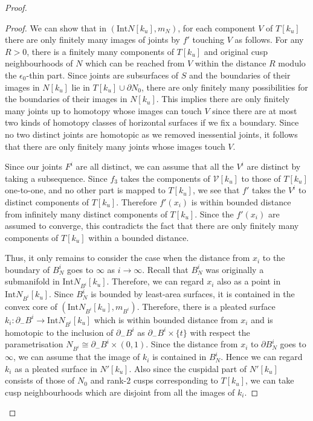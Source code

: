 \documentclass{amsart}
\theoremstyle{definition}
\numberwithin{figure}{section}
\numberwithin{equation}{section}
\def\cv{\mathcal{V}}
\def\Int{\mathrm{Int}}
\begin{document}
\begin{proof}
\begin{proof}
We can show that in $(\Int N[k_u], m_N)$, for each component $V$ of $T[k_u]$ there are only finitely many images of joints by $f'$ touching $V$ as follows.
For any $R>0$, there is a finitely many components of $T[k_u]$ and original cusp neighbourhoods of $N$ which can be reached from $V$ within the distance $R$ modulo the $\epsilon_0$-thin part.
Since joints are subsurfaces of $S$ and the boundaries of their images in $N[k_u]$ lie in $T[k_u] \cup \partial N_0$, there are only finitely many possibilities for the boundaries of their images in $N[k_u]$.
This implies there are only finitely many joints up to homotopy whose images can touch $V$ since there are at most two kinds of homotopy classes of horizontal surfaces if we fix a boundary.
Since no two distinct joints are homotopic as we removed inessential joints, it follows that there are only finitely many joints whose images touch $V$.

Since our joints $F^i$ are all distinct, we can assume that all the $V^i$ are distinct by taking a subsequence.
Since $f_3$ takes the components of $\cv[k_u]$ to those of $T[k_u]$ one-to-one, and no other part is mapped to $T[k_u]$, we see that $f'$ takes the $V^i$ to distinct components of $T[k_u]$.
Therefore $f'(x_i)$ is within bounded distance from infinitely many distinct components of $T[k_u]$.
Since the $f'(x_i)$ are assumed to  converge, this contradicts the fact that there are only finitely many components of $T[k_u]$ within a bounded distance.

 
Thus, it only remains to consider the case when the distance from $x_i$ to the boundary of $B^i_N$ goes to $\infty$ as $i \rightarrow \infty$.
Recall that $B^i_N$ was originally a submanifold in $\Int N_{B^i}[k_u]$.
Therefore, we can regard  $x_i$  also  as a point in $\Int N_{B^i}[k_u]$.
Since $B^i_N$ is bounded by least-area surfaces, it is contained in the convex core of $(\Int N_{B^i}[k_u], m_{B^i})$.
Therefore, there is a pleated surface $k_i : \partial_- B^i \rightarrow \Int N_{B^i}[k_u]$ which is within bounded distance from $x_i$ and is homotopic to the inclusion of $\partial_-B^i$ as $\partial_- B^i \times \{t\}$ with respect the parametrisation $N_{B^i} \cong \partial_- B^i \times (0,1)$.
Since the distance from $x_i$ to $\partial B^i_N$ goes to $\infty$, we can assume that the image of $k_i$ is contained in $B^i_N$.
Hence we can regard $k_i$ as a pleated surface in $N'[k_u]$.
Also since the cuspidal part of $N'[k_u]$ consists of those of $N_0$ and rank-$2$ cusps corresponding to $T[k_u]$, we can take cusp neighbourhoods which are disjoint from all the images of $k_i$.


\end{proof}
\end{proof}
\end{document}
